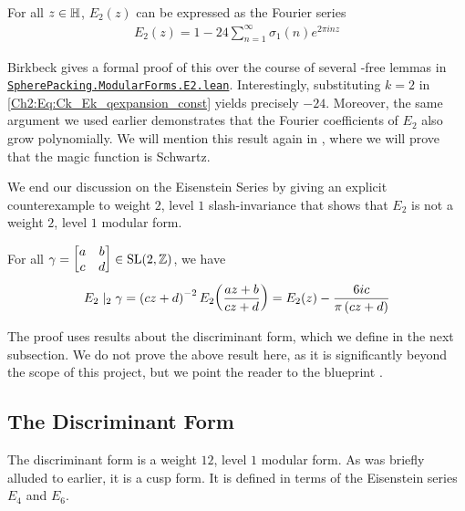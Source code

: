 \begin{boxtheorem}\label{Ch2:Thm:E2_qexpansion}
    For all $z \in \mathbb{H}$, $E_2(z)$ can be expressed as the Fourier series
    \begin{align}
        E_2(z) = 1 - 24 \sum_{n=1}^{\infty} \sigma_1(n) e^{2 \pi i n z}
        \label{Ch2:Eq:E2_qexpansion}
    \end{align}
\end{boxtheorem}

Birkbeck gives a formal proof of this over the course of several \sorry-free lemmas in \href{https://github.com/thefundamentaltheor3m/Sphere-Packing-Lean/blob/076f4b8d6a37fa95de3bc4764a5d7f911fde91e0/SpherePacking/ModularForms/E2.lean#L736}{\texttt{SpherePacking.ModularForms.E2.lean}}. Interestingly, substituting $k = 2$ in \eqref{Ch2:Eq:Ck_Ek_qexpansion_const} yields precisely $-24$. Moreover, the same argument we used earlier demonstrates that the Fourier coefficients of $E_2$ also grow polynomially. We will mention this result again in , where we will prove that the magic function is Schwartz.

 We end our discussion on the Eisenstein Series by giving an explicit counterexample to weight $2$, level $1$ slash-invariance that shows that $E_2$ is not a weight $2$, level $1$ modular form.

\begin{boxlemma}
    For all $\gamma = \begin{bmatrix} a & b \\ c & d \end{bmatrix} \in \operatorname{SL}\!\left( 2, \mathbb{Z} \right)$, we have
    \begin{align*}
        E_2 \mid_2 \gamma = \left( cz + d \right)^{-2} E_2\!\left( \frac{az + b}{cz + d} \right) = E_2(z) - \frac{6ic}{\pi\left( cz + d \right)}
    \end{align*}
\end{boxlemma}

The proof uses results about the discriminant form, which we define in the next subsection. We do not prove the above result here, as it is significantly beyond the scope of this project, but we point the reader to the blueprint \cite[Lemma 6.39]{blueprint}.

\subsection{The Discriminant Form}

The discriminant form is a weight $12$, level $1$ modular form. As was briefly alluded to earlier, it is a cusp form. It is defined in terms of the Eisenstein series $E_4$ and $E_6$.


